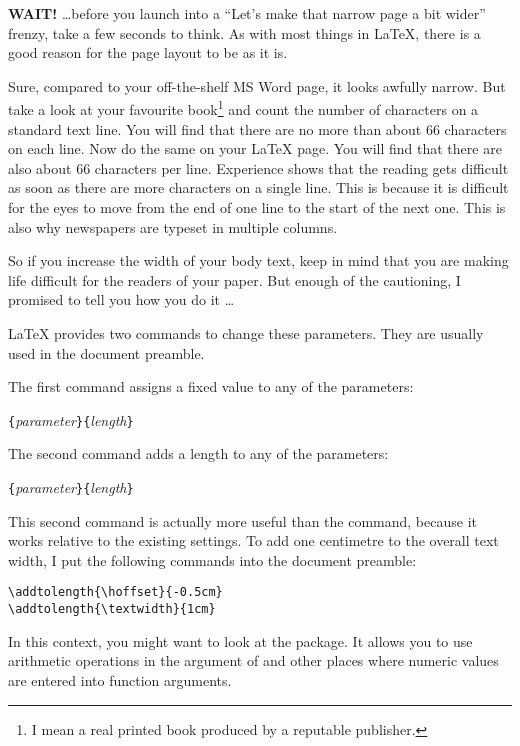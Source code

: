 \textbf{WAIT!} \ldots before you launch into a ``Let's make that
narrow page a bit wider'' frenzy, take a few seconds to think. As with
most things in \LaTeX, there is a good reason for the page layout to
be as it is.

Sure, compared to your off-the-shelf MS Word page, it looks awfully
narrow. But take a look at your favourite book\footnote{I mean a real
  printed book produced by a reputable publisher.} and count the number
of characters on a standard text line. You will find that there are no
more than about 66 characters on each line. Now do the same on your
\LaTeX{} page. You will find that there are also about 66 characters
per line.  Experience shows that the reading gets difficult as soon as
there are more characters on a single line. This is because it is
difficult for the eyes to move from the end of one line to the start of the next one.
This is also why newspapers are typeset in multiple columns.

So if you increase the width of your body text, keep in mind that you
are making life difficult for the readers of your paper. But enough
of the cautioning, I promised to tell you how you do it \ldots

\LaTeX{} provides two commands to change these parameters. They are
usually used in the document preamble.

The first command assigns a fixed value to any of the parameters:
\begin{lscommand}
  \verb|{|\emph{parameter}\verb|}{|\emph{length}\verb|}|
\end{lscommand}

The second command adds a length to any of the parameters:
\begin{lscommand}
  \verb|{|\emph{parameter}\verb|}{|\emph{length}\verb|}|
\end{lscommand}

This second command is actually more useful than the 
command, because it works relative to the existing settings.
To add one centimetre to the overall text width, I put the
following commands into the document preamble:
\begin{code}
\verb|\addtolength{\hoffset}{-0.5cm}|\\
\verb|\addtolength{\textwidth}{1cm}|
\end{code}

In this context, you might want to look at the  package.
It allows you to use arithmetic operations in the argument of 
and other places where numeric values are entered into function
arguments.

